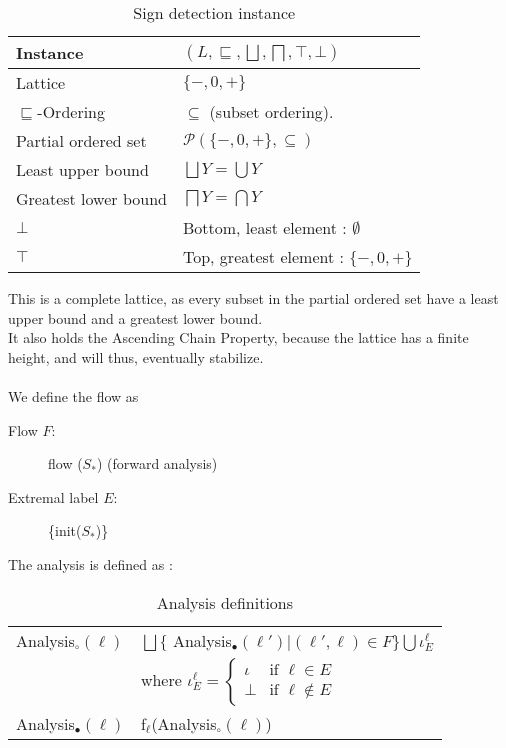 \begin{table}
\begin{tabular}{| l | l |}
  \hline
  Instance & $(L,\sqsubseteq,\bigsqcup, \bigsqcap, \top, \bot )$ \\
  \hline
  \hline
  Lattice  & $\{-,0,+\}$ \\
  \hline
  $\sqsubseteq$-Ordering  &  $\subseteq$ (subset ordering).\\
  \hline
  Partial ordered set    & $\mathcal{P}(\{-,0,+\}, \subseteq)$ \\
  \hline
  Least upper bound      & $\bigsqcup Y = \bigcup Y$\\
  \hline
  Greatest lower bound   & $\bigsqcap Y = \bigcap Y$\\
  \hline
  $\bot$                 & Bottom, least element : $\emptyset$\\
  \hline
  $\top$                 & Top, greatest element : $\{-,0,+\}$\\
\hline   
\end{tabular}
  \centering
  \caption{Sign detection instance}
  \label{table:sign_detection_instance}
\end{table}
This is a complete lattice, as every subset in the partial ordered set have a least upper bound and a greatest lower bound.\\
It also holds the Ascending Chain Property, because the lattice has a finite height, and will thus, eventually stabilize.\\\\
We define the flow as 
\begin{description}
  \item[Flow $F$:] flow ($S_*$) (forward analysis)
  \item[Extremal label $E$:] \{init($S_*$)\}
\end{description}

The analysis is defined as :
\begin{table}
\begin{tabular}{| l | l |}
  \hline
  Analysis$_\circ(\ell)$ & $ \bigsqcup \{$ Analysis$_\bullet (\ell') | (\ell', \ell) \in F \} \bigcup \iota_E^{\ell} $ \\
                         & where $\iota_E^{\ell} = \begin{cases} \iota & \text{if } \ell \in E \\ 
                                                                 \bot  & \text{if } \ell \notin E
                                                   \end{cases}$\\
  \hline
  Analysis$_\bullet(\ell)$ & f$_\ell$(Analysis$_\circ(\ell)$)\\
  \hline
\end{tabular}
\centering
\caption{Analysis definitions}
\end{table}

